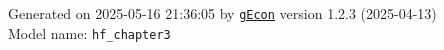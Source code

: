 \documentclass[10pt,a4paper]{article}
\numberwithin{equation}{section}
\begin{document}
\begin{flushleft}{\large
Generated  on 2025-05-16 21:36:05 by \href{http://gecon.r-forge.r-project.org/}{\texttt{gEcon}} version 1.2.3 (2025-04-13)\\
Model name: \verb+hf_chapter3+
}\end{flushleft}



\end{document}
